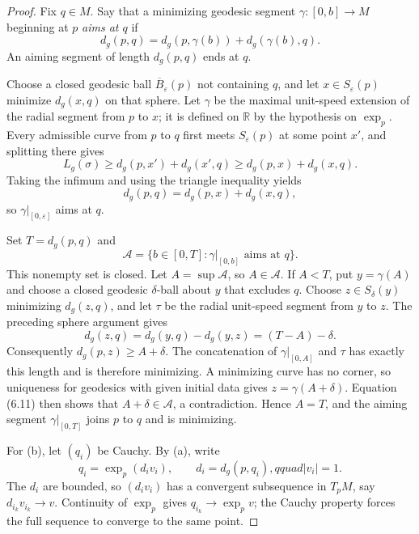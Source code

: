 \begin{proof}
\leanok
\sketch Fix $q\in M$. Say that a minimizing geodesic segment
$\gamma\colon[0,b]\to M$ beginning at $p$ \emph{aims at $q$} if
\begin{equation}
d_g(p,q)=d_g(p,\gamma(b))+d_g(\gamma(b),q). \tag{6.9}
\end{equation}
An aiming segment of length $d_g(p,q)$ ends at $q$.

Choose a closed geodesic ball $\overline B_\varepsilon(p)$ not containing
$q$, and let $x\in S_\varepsilon(p)$ minimize $d_g(x,q)$ on that sphere. Let
$\gamma$ be the maximal unit-speed extension of the radial segment from $p$ to
$x$; it is defined on $\mathbb R$ by the hypothesis on $\exp_p$. Every
admissible curve from $p$ to $q$ first meets $S_\varepsilon(p)$ at some point
$x'$, and splitting there gives
\[
L_g(\sigma)\geq d_g(p,x')+d_g(x',q)
\geq d_g(p,x)+d_g(x,q).
\]
Taking the infimum and using the triangle inequality yields
\begin{equation}
d_g(p,q)=d_g(p,x)+d_g(x,q), \tag{6.10}
\end{equation}
so $\gamma|_{[0,\varepsilon]}$ aims at $q$.

Set $T=d_g(p,q)$ and
\[
\mathcal A=\{b\in[0,T]:\gamma|_{[0,b]}\text{ aims at }q\}.
\]
This nonempty set is closed. Let $A=\sup\mathcal A$, so $A\in\mathcal A$.
If $A<T$, put $y=\gamma(A)$ and choose a closed geodesic
$\delta$-ball about $y$ that excludes $q$. Choose
$z\in S_\delta(y)$ minimizing $d_g(z,q)$, and let $\tau$ be the radial
unit-speed segment from $y$ to $z$. The preceding sphere argument gives
\begin{equation}
d_g(z,q)=d_g(y,q)-d_g(y,z)=(T-A)-\delta. \tag{6.11}
\end{equation}
Consequently $d_g(p,z)\geq A+\delta$. The concatenation of
$\gamma|_{[0,A]}$ and $\tau$ has exactly this length and is therefore
minimizing. A minimizing curve has no corner, so uniqueness for geodesics with
given initial data gives $z=\gamma(A+\delta)$. Equation (6.11) then shows that
$A+\delta\in\mathcal A$, a contradiction. Hence $A=T$, and the aiming segment
$\gamma|_{[0,T]}$ joins $p$ to $q$ and is minimizing.

For (b), let $(q_i)$ be Cauchy. By (a), write
\[
q_i=\exp_p(d_iv_i),
\qquad d_i=d_g(p,q_i),qquad |v_i|=1.
\]
The $d_i$ are bounded, so $(d_iv_i)$ has a convergent subsequence in $T_pM$,
say $d_{i_k}v_{i_k}\to v$. Continuity of $\exp_p$ gives
$q_{i_k}\to\exp_pv$; the Cauchy property forces the full sequence to converge
to the same point.
\end{proof}

